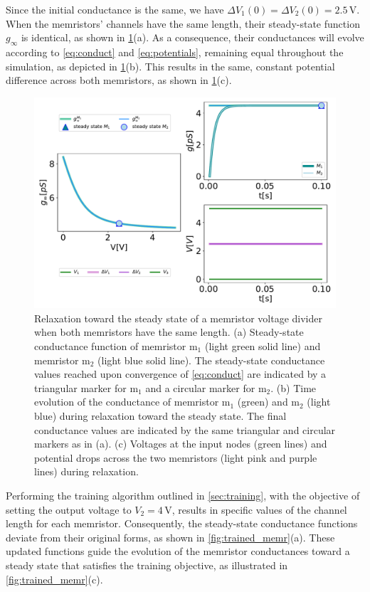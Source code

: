 \documentclass[reprint,superscriptaddress,prb,showkeys]{revtex4-2}
\newcommand{\m}{\text{m}} %
\begin{document}
Since the initial conductance is the same, we have $\Delta V_1(0) = \Delta V_2(0) = 2.5\,\text{V}$. When the memristors' channels have the same length, their steady-state function $g_{\infty}$ is identical, as shown in \cref{fig:equal_memr}(a). As a consequence, their conductances will evolve according to \cref{eq:conduct} and \cref{eq:potentials}, remaining equal throughout the simulation, as depicted in \cref{fig:equal_memr}(b). This results in the same, constant potential difference across both memristors, as shown in \cref{fig:equal_memr}(c).
\begin{figure}[h]
    \centering
    \includegraphics[width=\columnwidth]{plots/appendixA/grid_initial_condition.pdf}
    \caption{Relaxation toward the steady state of a memristor voltage divider when both memristors have the same length. (a) Steady-state conductance function of memristor $\m_1$ (light green solid line) and memristor $\m_2$ (light blue solid line). The steady-state conductance values reached upon convergence of \cref{eq:conduct} are indicated by a triangular marker for $\m_1$ and a circular marker for $\m_2$. (b) Time evolution of the conductance of memristor $\m_1$ (green) and $\m_2$ (light blue) during relaxation toward the steady state. The final conductance values are indicated by the same triangular and circular markers as in (a). (c) Voltages at the input nodes (green lines) and potential drops across the two memristors (light pink and purple lines) during relaxation.
    }
    \label{fig:equal_memr}
\end{figure} 

Performing the training algorithm outlined in \cref{sec:training}, with the objective of setting the output voltage to $V_2 = 4\,\mathrm{V}$, results in specific values of the channel length for each memristor. Consequently, the steady-state conductance functions deviate from their original forms, as shown in \cref{fig:trained_memr}(a). These updated functions guide the evolution of the memristor conductances toward a steady state that satisfies the training objective, as illustrated in \cref{fig:trained_memr}(c). 
\end{document}
